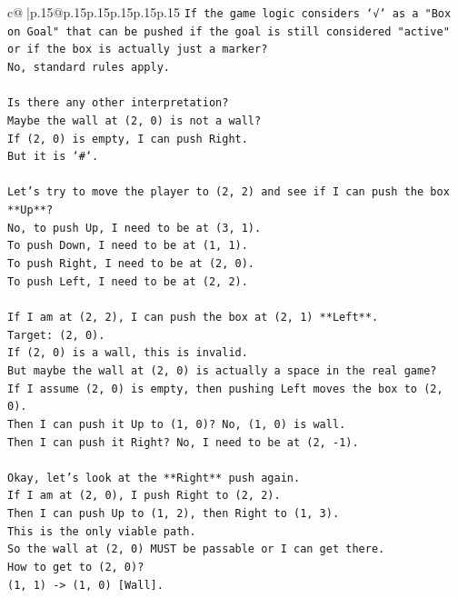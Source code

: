 \documentclass{article}
\begin{document}
{\begin{supertabular}{c@{$\;$}|p{.15\linewidth}@{}p{.15\linewidth}p{.15\linewidth}p{.15\linewidth}p{.15\linewidth}p{.15\linewidth}}
{{{\texttt{If the game logic considers `√` as a "Box on Goal" that can be pushed if the goal is still considered "active" or if the box is actually just a marker?} \\
\texttt{No, standard rules apply.} \\
\\ 
\texttt{Is there any other interpretation?} \\
\texttt{Maybe the wall at (2, 0) is not a wall?} \\
\texttt{If (2, 0) is empty, I can push Right.} \\
\texttt{But it is `\#`.} \\
\\ 
\texttt{Let's try to move the player to (2, 2) and see if I can push the box **Up**?} \\
\texttt{No, to push Up, I need to be at (3, 1).} \\
\texttt{To push Down, I need to be at (1, 1).} \\
\texttt{To push Right, I need to be at (2, 0).} \\
\texttt{To push Left, I need to be at (2, 2).} \\
\\ 
\texttt{If I am at (2, 2), I can push the box at (2, 1) **Left**.} \\
\texttt{Target: (2, 0).} \\
\texttt{If (2, 0) is a wall, this is invalid.} \\
\texttt{But maybe the wall at (2, 0) is actually a space in the real game?} \\
\texttt{If I assume (2, 0) is empty, then pushing Left moves the box to (2, 0).} \\
\texttt{Then I can push it Up to (1, 0)? No, (1, 0) is wall.} \\
\texttt{Then I can push it Right? No, I need to be at (2, {-}1).} \\
\\ 
\texttt{Okay, let's look at the **Right** push again.} \\
\texttt{If I am at (2, 0), I push Right to (2, 2).} \\
\texttt{Then I can push Up to (1, 2), then Right to (1, 3).} \\
\texttt{This is the only viable path.} \\
\texttt{So the wall at (2, 0) MUST be passable or I can get there.} \\
\texttt{How to get to (2, 0)?} \\
\texttt{(1, 1) {-}> (1, 0) {[}Wall{]}.} \\
}}}
\end{supertabular}}
\end{document}
